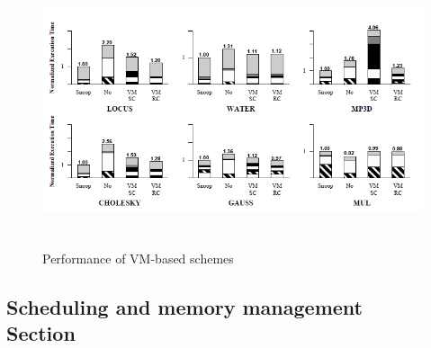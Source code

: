 \documentclass[a4paper,10pt]{article}
\begin{document}
\begin{multicols}{2}
\begin{figure}
 \centering
 \includegraphics[width=16cm, height=8cm]{./eps/result1.PNG}
 \caption{Performance of VM-based schemes}
 \label{fig:result1}
\end{figure}

\subsection{Scheduling and memory management \\ Section}





\end{multicols}
\end{document}
